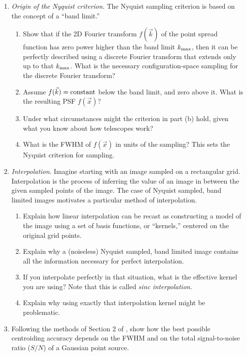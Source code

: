 \begin{enumerate}
\item {\it Origin of the Nyquist criterion}. The Nyquist
    sampling criterion is based on the concept of a ``band
    limit.''
    \begin{enumerate}
    \item Show that if the 2D Fourier
    transform $f(\vec{k})$ of the point spread function has zero power
    higher than the band limit $k_{\rm max}$, then it can be perfectly
    described using a discrete Fourier transform that extends only up
    to that $k_{\rm max}$. What is the necessary configuration-space
    sampling for the discrete Fourier transform?
    \item Assume $f(\vec{k}) = {\rm constant}$
    below the band limit, and zero above it. What is the resulting PSF
    $f(\vec{x})$?
    \item Under what circumstances might the criterion in part (b)
    hold, given what you know about how telescopes work?
    \item What is the FWHM of $f(\vec{x})$ in units of the sampling?
    This sets the Nyquist criterion for sampling.
    \end{enumerate}
\item {\it Interpolation}. Imagine starting with an image sampled on a
    rectangular grid. Interpolation is the process of inferring
    the value of an image in between the given sampled points of the
    image. The case of Nyquist sampled, band limited images motivates
    a particular method of interpolation.
    \begin{enumerate}
    \item Explain how linear interpolation can be recast as
    constructing a model of the image using a set of basis functions,
    or ``kernels,'' centered on the original grid points.
    \item Explain why a (noiseless) Nyquist sampled, band limited
    image contains all the information necessary for perfect
    interpolation.
    \item If you interpolate perfectly in that situation, what is the
    effective kernel you are using? Note that this is called {\it
    sinc interpolation}.
    \item Explain why using exactly that interpolation kernel might be
    problematic.
    \end{enumerate}
\item Following the methods of Section 2 of \citet{vakili16a}, show
    how the best possible centroiding accuracy depends on the FWHM and
    on the total signal-to-noise ratio ($S/N$) of a Gaussian point
    source.
\end{enumerate}

